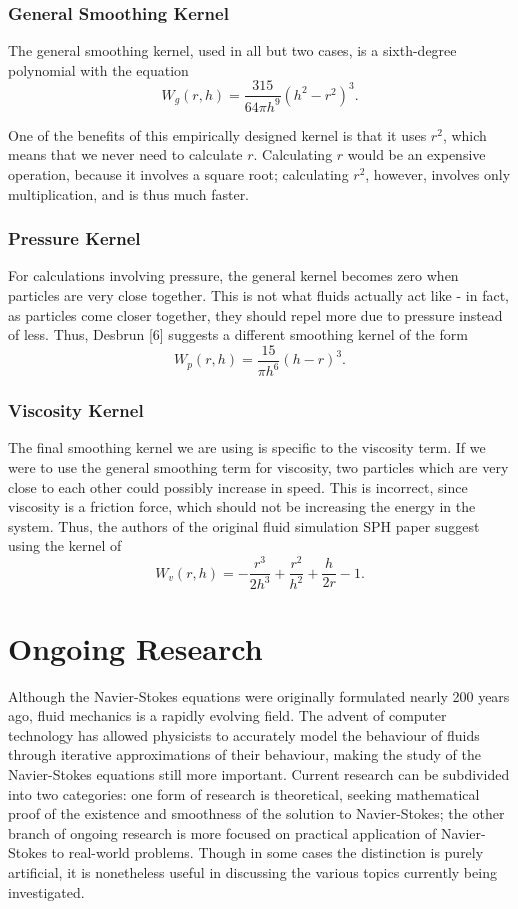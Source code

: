 \documentclass[a4paper]{article}
\begin{document}
\subsubsection{General Smoothing Kernel}
The general smoothing kernel, used in all but two cases, is a sixth-degree polynomial with the equation
\[W_{g}(r, h) = \frac{315}{64\pi h^9} \left(h^2 - r^2\right)^3.\]

One of the benefits of this empirically designed kernel is that it uses $r^2$, which means that we never need to calculate $r$. Calculating $r$ would be an expensive operation, because it involves a square root; calculating $r^2$, however, involves only multiplication, and is thus much faster.

\subsubsection{Pressure Kernel}
For calculations involving pressure, the general kernel becomes zero when particles are very close together. This is not what fluids actually act like - in fact, as particles come closer together, they should repel more due to pressure instead of less. Thus, Desbrun [6] suggests a different smoothing kernel of the form
\[W_{p}( r, h) = \frac{15}{\pi h^6} \left(h - r\right)^3.\]

\subsubsection{Viscosity Kernel}
The final smoothing kernel we are using is specific to the viscosity term. If we were to use the general smoothing term for viscosity, two particles which are very close to each other could possibly increase in speed. This is incorrect, since viscosity is a friction force, which should not be increasing the energy in the system. Thus, the authors of the original fluid simulation SPH paper suggest using the kernel of
\[W_{v}(r, h) = -\frac{r^3}{2h^3} + \frac{r^2}{h^2} + \frac{h}{2r} - 1.\]

\section{Ongoing Research}
Although the Navier-Stokes equations were originally formulated nearly 200 years ago, fluid mechanics is a rapidly evolving field. The advent of computer technology has allowed physicists to accurately model the behaviour of fluids through iterative approximations of their behaviour, making the study of the Navier-Stokes equations still more important. Current research can be subdivided into two categories: one form of research is theoretical, seeking mathematical proof of the existence and smoothness of the solution to Navier-Stokes; the other branch of ongoing research is more focused on practical application of Navier-Stokes to real-world problems. Though in some cases the distinction is purely artificial, it is nonetheless useful in discussing the various topics currently being investigated.
\end{document}
